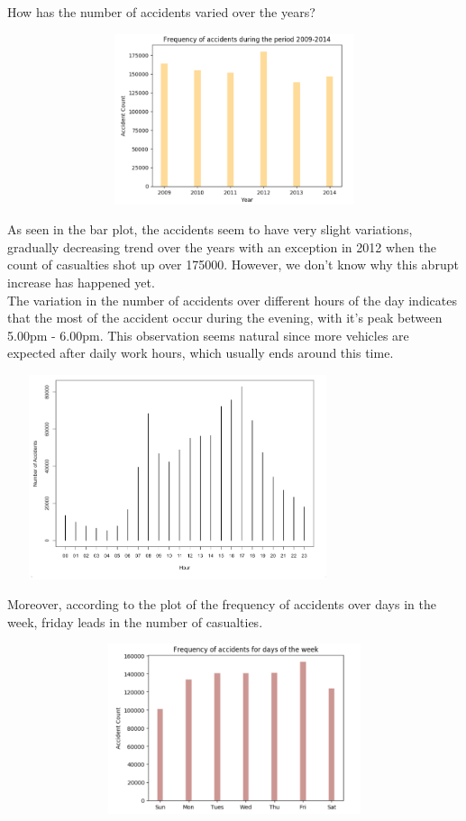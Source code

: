 \documentclass[a4paper, 10pt]{article}
\begin{document}
   How has the number of accidents varied over the years?

   \begin{center}
     \includegraphics[width=20cm,height=5cm, scale=0.8,keepaspectratio]{counts.png}
   \end{center}

   As seen in the bar plot, the accidents seem to have very slight variations, gradually decreasing trend over the years with an exception in 2012 when the count of casualties
   shot up over 175000. However, we don't know why this abrupt increase has happened yet. \\

   The variation in the number of accidents over different hours of the day indicates that the most of the accident occur during the evening, with it's peak between 5.00pm - 6.00pm.
   This observation seems natural since more vehicles are expected after daily work hours, which usually ends around this time.
   
   \begin{center}
     \includegraphics[width=10cm,height=6cm, scale=0.8,keepaspectratio]{hour-study.png}
   \end{center}

  Moreover, according to the plot of the frequency of accidents over days in the week, friday leads in the number of casualties. 
   
   \begin{center}
     \includegraphics[width=30cm,height=5cm, scale=0.8,keepaspectratio]{day-study.png}
   \end{center}
\end{document}
